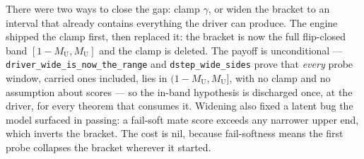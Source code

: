\documentclass[11pt]{article}
\newcommand{\MU}{M_{\mathrm{U}}}    %
\theoremstyle{plain}
\theoremstyle{definition}
\theoremstyle{remark}
\begin{document}
There were two ways to close the gap: clamp $\gamma$, or widen the
bracket to an interval that already contains everything the driver can
produce.  The engine shipped the clamp first, then replaced it: the
bracket is now the full flip-closed band $[1-\MU, \MU]$ and the clamp
is deleted.  The payoff is unconditional ---
\texttt{driver\_wide\_is\_now\_the\_range} and
\texttt{dstep\_wide\_sides} prove that \emph{every} probe window,
carried ones included, lies in $(1-\MU, \MU]$, with no clamp and no
assumption about scores --- so the in-band hypothesis is discharged
once, at the driver, for every theorem that consumes it.  Widening also
fixed a latent bug the model surfaced in passing: a fail-soft mate
score exceeds any narrower upper end, which inverts the bracket.  The
cost is nil, because fail-softness means the first probe collapses the
bracket wherever it started.
\end{document}
